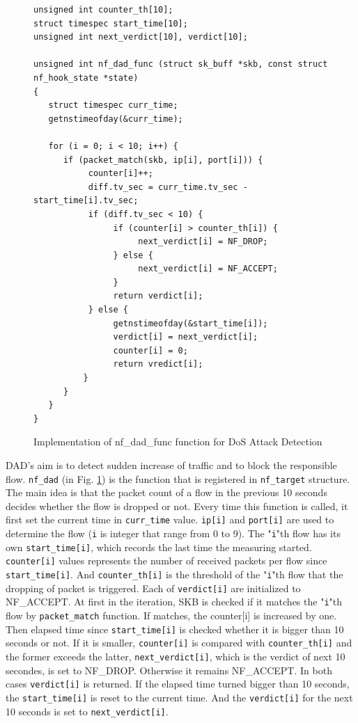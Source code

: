 \begin{figure}
	\begin{center}
		\begin{screen}
			\begin{verbatim}
unsigned int counter_th[10];
struct timespec start_time[10];
unsigned int next_verdict[10], verdict[10];

unsigned int nf_dad_func (struct sk_buff *skb, const struct nf_hook_state *state) 
{
   struct timespec curr_time;
   getnstimeofday(&curr_time);

   for (i = 0; i < 10; i++) {
      if (packet_match(skb, ip[i], port[i])) {
           counter[i]++;
           diff.tv_sec = curr_time.tv_sec - start_time[i].tv_sec;
           if (diff.tv_sec < 10) {
                if (counter[i] > counter_th[i]) {
                     next_verdict[i] = NF_DROP;
                } else {
                     next_verdict[i] = NF_ACCEPT;
                }
                return verdict[i];
           } else {
                getnstimeofday(&start_time[i]);
                verdict[i] = next_verdict[i];
                counter[i] = 0;
                return vredict[i];
          }
      }
   }
}
			\end{verbatim}	
		\end{screen}
	\end{center}
	\caption{Implementation of nf\_dad\_func function for DoS Attack Detection}
	\label{fig: nf_dad_func}
\end{figure}

DAD's aim is to detect sudden increase of traffic and to block the responsible flow. {\tt nf\_dad} (in Fig. \ref{fig: nf_dad_func}) is the function that is registered in {\tt nf\_target} structure. The main idea is that the packet count of a flow in the previous 10 seconds decides whether the flow is dropped or not. 
Every time this function is called, it first set the current time in {\tt curr\_time} value. {\tt ip[i]} and {\tt port[i]} are used to determine the flow ({\tt i} is integer that range from 0 to 9). The "{\tt i}"th flow has its own {\tt start\_time[i]}, which records the last time the measuring started. {\tt counter[i]} values represents the number of received packets per flow since {\tt start\_time[i]}. And {\tt counter\_th[i]} is the threshold of the "{\tt i}"th flow that the dropping of packet is triggered. Each of {\tt verdict[i]} are initialized to NF\_ACCEPT. At first in the iteration, SKB is checked if it matches the "{\tt i}"th flow by {\tt packet\_match} function. If matches, the counter[i] is increased by one. Then elapsed time since {\tt start\_time[i]} is checked whether it is bigger than 10 seconds or not. If it is smaller, {\tt counter[i]} is compared with {\tt counter\_th[i]} and the former exceeds the latter, {\tt next\_verdict[i]}, which is the verdict of next 10 secondes, is set to NF\_DROP. Otherwise it remains NF\_ACCEPT. In both cases {\tt verdict[i]} is returned. If the elapsed time turned bigger than 10 seconds, the {\tt start\_time[i]} is reset to the current time. And the {\tt verdict[i]} for the next 10 seconds is set to {\tt next\_verdict[i]}. 

